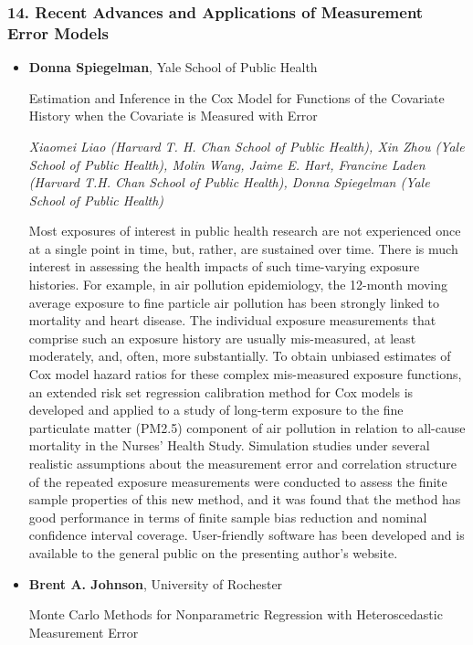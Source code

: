 \subsubsection*{14. Recent Advances and Applications of Measurement Error Models}

\begin{itemize}
\item \textbf{Donna Spiegelman}, Yale School of Public Health

Estimation and Inference in the Cox Model for Functions of the Covariate History when the Covariate is Measured with Error

\emph{\footnotesize Xiaomei Liao (Harvard T. H. Chan School of Public Health), Xin Zhou (Yale School of Public Health), Molin Wang, Jaime E. Hart, Francine Laden (Harvard T.H. Chan School of Public Health), Donna Spiegelman (Yale School of Public Health)}

Most exposures of interest in public health research are not experienced once at a single point in time, but, rather, are sustained over time. There is much interest in assessing the health impacts of such time-varying exposure histories. For example, in air pollution epidemiology, the 12-month moving average exposure to fine particle air pollution has been strongly linked to mortality and heart disease. The individual exposure measurements that comprise such an exposure history are usually mis-measured, at least moderately, and, often, more substantially. To obtain unbiased estimates of Cox model hazard ratios for these complex mis-measured exposure functions, an extended risk set regression calibration method for Cox models is developed and applied to a study of long-term exposure to the fine particulate matter (PM2.5) component of air pollution in relation to all-cause mortality in the Nurses’ Health Study. Simulation studies under several realistic assumptions about the measurement error and correlation structure of the repeated exposure measurements were conducted to assess the finite sample properties of this new method, and it was found that the method has good performance in terms of finite sample bias reduction and nominal confidence interval coverage. User-friendly software has been developed and is available to the general public on the presenting author’s website.

\item \textbf{Brent A. Johnson}, University of Rochester

Monte Carlo Methods for Nonparametric Regression with Heteroscedastic Measurement Error


\end{itemize}
